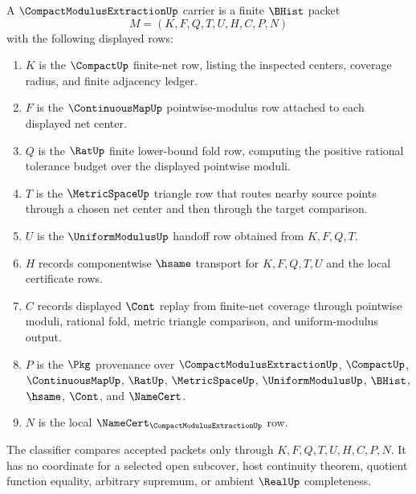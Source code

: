 \begin{definition}
\label{def:compact-modulus-extraction-carrier}
A $\CompactModulusExtractionUp$ carrier is a finite $\BHist$ packet
$$
M=(K,F,Q,T,U,H,C,P,N)
$$
with the following displayed rows:
\begin{enumerate}
\item $K$ is the $\CompactUp$ finite-net row, listing the inspected centers, coverage radius, and finite adjacency ledger.
\item $F$ is the $\ContinuousMapUp$ pointwise-modulus row attached to each displayed net center.
\item $Q$ is the $\RatUp$ finite lower-bound fold row, computing the positive rational tolerance budget over the displayed pointwise moduli.
\item $T$ is the $\MetricSpaceUp$ triangle row that routes nearby source points through a chosen net center and then through the target comparison.
\item $U$ is the $\UniformModulusUp$ handoff row obtained from $K,F,Q,T$.
\item $H$ records componentwise $\hsame$ transport for $K,F,Q,T,U$ and the local certificate rows.
\item $C$ records displayed $\Cont$ replay from finite-net coverage through pointwise moduli, rational fold, metric triangle comparison, and uniform-modulus output.
\item $P$ is the $\Pkg$ provenance over $\CompactModulusExtractionUp$, $\CompactUp$, $\ContinuousMapUp$, $\RatUp$, $\MetricSpaceUp$, $\UniformModulusUp$, $\BHist$, $\hsame$, $\Cont$, and $\NameCert$.
\item $N$ is the local $\NameCert_{\CompactModulusExtractionUp}$ row.
\end{enumerate}
The classifier compares accepted packets only through $K,F,Q,T,U,H,C,P,N$. It has no coordinate for a selected open subcover, host continuity theorem, quotient function equality, arbitrary supremum, or ambient $\RealUp$ completeness.
\end{definition}

